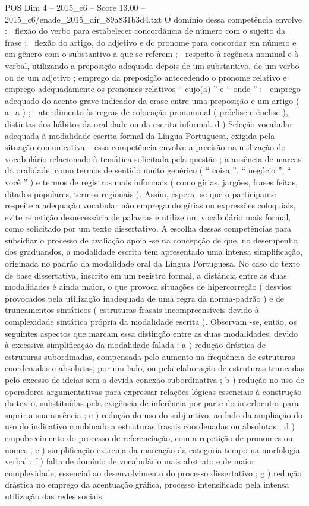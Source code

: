 \begin{textsample}{POS Dim 4 – 2015\_c6 – Score 13.00 – 2015\_c6/enade\_2015\_dir\_89a831b3d4.txt}
O domínio dessa competência envolve :  flexão do verbo para estabelecer concordância de número com o sujeito da frase ;  flexão do artigo, do adjetivo e do pronome para concordar em número e em gênero com o substantivo a que se referem ;  respeito à regência nominal e à verbal, utilizando a preposição adequada depois de um substantivo, de um verbo ou de um adjetivo ; emprego da preposição antecedendo o pronome relativo e emprego adequadamente os pronomes relativos “ cujo(a) ” e “ onde ” ;  emprego adequado do acento grave indicador da crase entre uma preposição e um artigo ( a+a ) ;  atendimento às regras de colocação pronominal ( próclise e ênclise ), distintas dos hábitos da oralidade ou da escrita informal. d ) Seleção vocabular adequada à modalidade escrita formal da Língua Portuguesa, exigida pela situação comunicativa – essa competência envolve a precisão na utilização do vocabulário relacionado à temática solicitada pela questão ; a ausência de marcas da oralidade, como termos de sentido muito genérico ( “ coisa ”, “ negócio ”, “ você ” ) e termos de registros mais informais ( como gírias, jargões, frases feitas, ditados populares, termos regionais ).
Assim, espera -se que o participante respeite a adequação vocabular não empregando gírias ou expressões coloquiais, evite repetição desnecessária de palavras e utilize um vocabulário mais formal, como solicitado por um texto dissertativo.
A escolha dessas competências para subsidiar o processo de avaliação apoia -se na concepção de que, no desempenho dos graduandos, a modalidade escrita tem apresentado uma intensa simplificação, originada no padrão da modalidade oral da Língua Portuguesa.
No caso do texto de base dissertativa, inscrito em um registro formal, a distância entre as duas modalidades é ainda maior, o que provoca situações de hipercorreção ( desvios provocados pela utilização inadequada de uma regra da norma-padrão ) e de truncamentos sintáticos ( estruturas frasais incompreensíveis devido à complexidade sintática própria da modalidade escrita ).
Observam -se, então, os seguintes aspectos que marcam essa distinção entre as duas modalidades, devido à excessiva simplificação da modalidade falada : a ) redução drástica de estruturas subordinadas, compensada pelo aumento na frequência de estruturas coordenadas e absolutas, por um lado, ou pela elaboração de estruturas truncadas pelo excesso de ideias sem a devida conexão subordinativa ; b ) redução no uso de operadores argumentativas para expressar relações lógicas essenciais à construção do texto, substituídas pela exigência de inferência por parte do interlocutor para suprir a sua ausência ; c ) redução do uso do subjuntivo, ao lado da ampliação do uso do indicativo combinado a estruturas frasais coordenadas ou absolutas ; d ) empobrecimento do processo de referenciação, com a repetição de pronomes ou nomes ; e ) simplificação extrema da marcação da categoria tempo na morfologia verbal ; f ) falta de domínio de vocabulário mais abstrato e de maior complexidade, essencial ao desenvolvimento do processo dissertativo ; g ) redução drástica no emprego da acentuação gráfica, processo intensificado pela intensa utilização das redes sociais.

\end{textsample}
